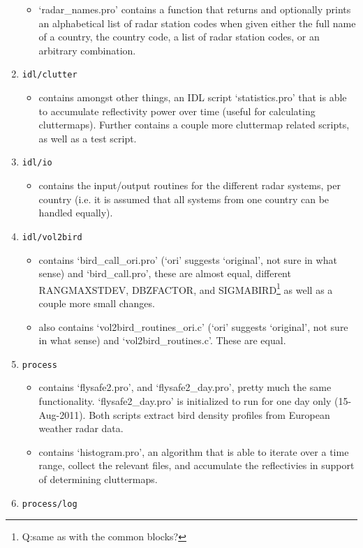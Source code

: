 \begin{enumerate}
\begin{itemize}
\item{`radar\_names.pro' contains a function that returns and optionally prints an alphabetical list of radar station codes when given either the full name of a country, the country code, a list of radar station codes, or an arbitrary combination.}
\end{itemize}
\item{\texttt{idl/clutter}}
\begin{itemize}
\item[]{contains amongst other things, an IDL script `statistics.pro' that is able to accumulate reflectivity power over time (useful for calculating cluttermaps). Further contains a couple more cluttermap related scripts, as well as a test script.}
\end{itemize}
\item{\texttt{idl/io}}
\begin{itemize}
\item[]{contains the input/output routines for the different radar systems, per country (i.e. it is assumed that all systems from one country can be handled equally).
}
\end{itemize}
\item{\texttt{idl/vol2bird}}
\begin{itemize}
\item{contains `bird\_call\_ori.pro' (`ori' suggests `original', not sure in what sense) and `bird\_call.pro', these are almost equal, different RANGMAXSTDEV, DBZFACTOR, and SIGMABIRD\footnote{Q:same as with the common blocks?} as well as a couple more small changes. }
\item{also contains `vol2bird\_routines\_ori.c' (`ori' suggests `original', not sure in what sense) and `vol2bird\_routines.c'. These are equal.}
\end{itemize}
\item{\texttt{process}}
\begin{itemize}
\item{contains `flysafe2.pro', and `flysafe2\_day.pro', pretty much the same functionality. `flysafe2\_day.pro' is initialized to run for one day only (15-Aug-2011). Both scripts extract bird density profiles from European weather radar data.}
\item{contains `histogram.pro', an algorithm that is able to iterate over a time range, collect the relevant files, and accumulate the reflectivies in support of determining cluttermaps.}
\end{itemize}
\item{\texttt{process/log}}

\end{enumerate}
